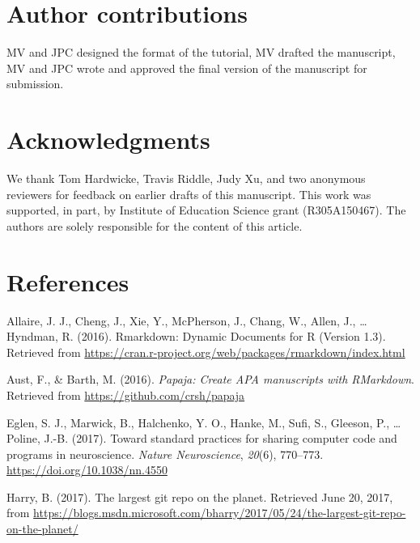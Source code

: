 \documentclass[
  american,
  ,doc,floatsintext]{apa6}
\begin{document}
\hypertarget{author-contributions}{%
\section{Author contributions}\label{author-contributions}}

MV and JPC designed the format of the tutorial, MV drafted the manuscript, MV and JPC wrote and approved the final version of the manuscript for submission.

\hypertarget{acknowledgments}{%
\section{Acknowledgments}\label{acknowledgments}}

We thank Tom Hardwicke, Travis Riddle, Judy Xu, and two anonymous reviewers for feedback on earlier drafts of this manuscript. This work was supported, in part, by Institute of Education Science grant (R305A150467). The authors are solely responsible for the content of this article.

\newpage

\hypertarget{references}{%
\section{References}\label{references}}

\setlength{\parindent}{-0.5in}
\setlength{\leftskip}{0.5in}

\hypertarget{refs}{}
\leavevmode\hypertarget{ref-allaire_rmarkdown:_2016}{}%
Allaire, J. J., Cheng, J., Xie, Y., McPherson, J., Chang, W., Allen, J., \ldots{} Hyndman, R. (2016). Rmarkdown: Dynamic Documents for R (Version 1.3). Retrieved from \url{https://cran.r-project.org/web/packages/rmarkdown/index.html}

\leavevmode\hypertarget{ref-aust_papaja:_2016}{}%
Aust, F., \& Barth, M. (2016). \emph{Papaja: Create APA manuscripts with RMarkdown}. Retrieved from \url{https://github.com/crsh/papaja}

\leavevmode\hypertarget{ref-eglen_toward_2017}{}%
Eglen, S. J., Marwick, B., Halchenko, Y. O., Hanke, M., Sufi, S., Gleeson, P., \ldots{} Poline, J.-B. (2017). Toward standard practices for sharing computer code and programs in neuroscience. \emph{Nature Neuroscience}, \emph{20}(6), 770--773. \url{https://doi.org/10.1038/nn.4550}

\leavevmode\hypertarget{ref-harry_largest_2017}{}%
Harry, B. (2017). The largest git repo on the planet. Retrieved June 20, 2017, from \url{https://blogs.msdn.microsoft.com/bharry/2017/05/24/the-largest-git-repo-on-the-planet/}
\end{document}

